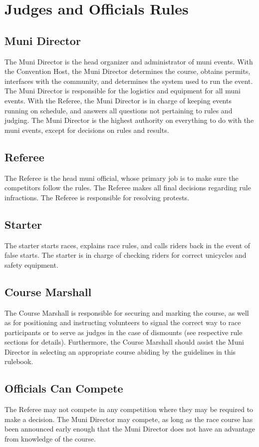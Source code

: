 \chapter{Judges and Officials Rules}

\section{Muni Director}

The Muni Director is the head organizer and administrator of muni events.
With the Convention Host, the Muni Director determines the course, obtains permits, interfaces with the community, and determines the system used to run the event.
The Muni Director is responsible for the logistics and equipment for all muni events.
With the Referee, the Muni Director is in charge of keeping events running on schedule, and answers all questions not pertaining to rules and judging.
The Muni Director is the highest authority on everything to do with the muni events, except for decisions on rules and results.

\section{Referee}

The Referee is the head muni official, whose primary job is to make sure the competitors follow the rules.
The Referee makes all final decisions regarding rule infractions.
The Referee is responsible for resolving protests.

\section{Starter}

The starter starts races, explains race rules, and calls riders back in the event of false starts.
The starter is in charge of checking riders for correct unicycles and safety equipment.

\section{Course Marshall}
The Course Marshall is responsible for securing and marking the course, as well as for positioning and instructing volunteers to signal the correct way to race participants or to serve as judges in the case of dismounts (see respective rule sections for details).  Furthermore, the Course Marshall should assist the Muni Director in selecting an appropriate course abiding by the guidelines in this rulebook.

\section{Officials Can Compete}

The Referee may not compete in any competition where they may be required to make a decision.
The Muni Director may compete, as long as the race course has been announced early enough that the Muni Director does not have an advantage from knowledge of the course.
